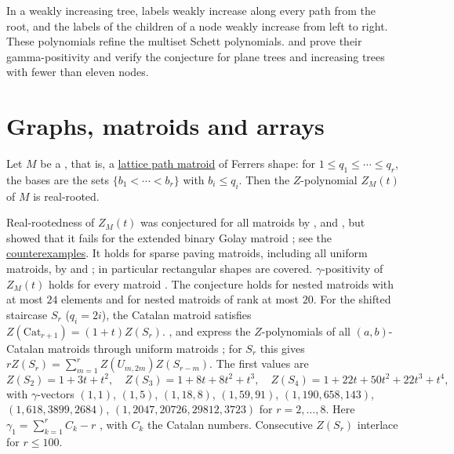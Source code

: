In a weakly increasing tree, labels weakly increase along every path from
the root, and the labels of the children of a node weakly increase from
left to right.  These polynomials refine the multiset Schett polynomials.
 and  prove their gamma-positivity and verify
the conjecture for plane trees and increasing trees with fewer than eleven
nodes.


\section[openProblemsGraphs]{Graphs, matroids and arrays}

\begin{conjecture}[Alexandersson, 2026]
\label{conjNestedMatroidZ}
Let $M$ be a , that is, a
\hyperref[latticePathMatroidDefinition]{lattice path matroid} of Ferrers shape:
for $1\leq q_1\leq\dotsb\leq q_r$, the bases are the sets
$\{b_1<\dotsb<b_r\}$ with $b_i\leq q_i$.  Then the $Z$-polynomial $Z_M(t)$ of
$M$ \cite{ProudfootXuYoung2018} is real-rooted.
\end{conjecture}

Real-rootedness of $Z_M(t)$ was conjectured for all matroids by
,  and 
\cite{ProudfootXuYoung2018}, but  showed that it
fails for the extended binary Golay matroid \cite{Eberhardt2026x}; see the
\hyperref[realRootedCounterexamples]{counterexamples}.  It holds for sparse
paving matroids, including all uniform matroids, by  and
 \cite[Thm.~1.1]{XieZhang2026SparsePaving}; in particular
rectangular shapes are covered.  $\gamma$-positivity of $Z_M(t)$ holds for every
matroid \cite[Thm.~1.8]{FerroniMatherneStevensVecchi2022x}.  The conjecture
holds for nested matroids with at most $24$ elements and for nested matroids
of rank at most $20$.
For the shifted staircase $S_r$ ($q_i=2i$), the Catalan matroid satisfies
$Z(\mathrm{Cat}_{r+1})=(1+t)Z(S_r)$.  ,  and
 express the $Z$-polynomials of all $(a,b)$-Catalan matroids
through uniform matroids \cite[Cor.~4.13]{ChenLiYao2025x}; for $S_r$ this gives
$rZ(S_r)=\sum_{m=1}^{r}Z(U_{m,2m})Z(S_{r-m})$.  The first values are
\[
Z(S_2)=1+3t+t^2,\quad Z(S_3)=1+8t+8t^2+t^3,\quad
Z(S_4)=1+22t+50t^2+22t^3+t^4,
\]
with $\gamma$-vectors $(1,1)$, $(1,5)$, $(1,18,8)$, $(1,59,91)$,
$(1,190,658,143)$, $(1,618,3899,2684)$, $(1,2047,20726,29812,3723)$ for
$r=2,\dotsc,8$.  Here $\gamma_1=\sum_{k=1}^{r}C_k-r$ , with $C_k$ the
Catalan numbers.  Consecutive $Z(S_r)$ interlace for $r\leq100$.

